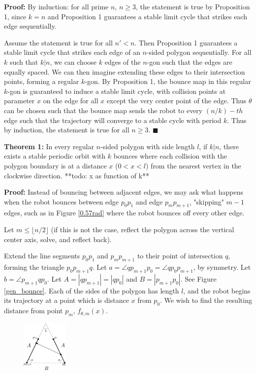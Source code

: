 \documentclass[letterpaper, 10 pt, conference]{ieeeconf}  %
\begin{document}
\textbf{Proof:} By induction: for all prime $n$, $n \geq 3$, the statement is true by
Proposition 1, since $k=n$ and Proposition 1 guarantees a stable limit cycle that strikes
each edge sequentially.

Assume the statement is true for all $n' < n$. Then Proposition 1 guarantees a stable
limit cycle that strikes each edge of an $n$-sided polygon sequentially. For all
$k$ such that $k|n$, we can choose $k$ edges of the $n$-gon such that the edges
are equally spaced. We can then imagine extending these edges to their
intersection points, forming a regular $k$-gon. By Proposition 1, the bounce map in this
regular $k$-gon is guaranteed to induce a stable limit cycle, with collision
points at parameter $x$ on the edge for all $x$ except the very center point
of the edge. Thus $\theta$ can be chosen such that the bounce map sends the
robot to every $(n/k)-th$ edge such that the trajectory will converge to a
stable cycle with period $k$. Thus by induction, the statement is true for all
$n \geq 3$. \hfill $\blacksquare$

\textbf{Theorem 1:} In every regular $n$-sided polygon with side length $l$, if $k|n$,
there exists a stable periodic orbit with $k$ bounces where each collision with
the polygon boundary is at a distance $x$ ($0 < x < l$) from the nearest vertex in
the clockwise direction. **todo: x as function of k** 

\textbf{Proof:} Instead of bouncing between adjacent edges, we may ask what happens when the
robot bounces between edge $p_0 p_1$ and edge $p_m p_{m+1}$, "skipping" $m-1$
edges, such as in Figure \ref{0.57rad} where the robot bounces off every other
edge.

Let $m \leq \lfloor n/2 \rfloor$ (if this is not the case, reflect the polygon
across the vertical center axis, solve, and reflect back).

Extend the line segments $p_0 p_1$ and $p_m p_{m+1}$ to their point of
intersection $q$, forming the triangle $p_0 p_{m+1} q$. Let $a = \angle q
p_{m+1} p_0 = \angle q p_0 p_{m+1}$, by symmetry. Let $b = \angle p_{m+1} q
p_0$. Let $A = |q p_{m+1}| = |q p_0|$ and $B = |p_{m+1} p_0|$. See Figure
\ref{gen_bounce}. Each of the sides of the polygon has length $l$, and the robot
begins its trajectory at a point which is distance $x$ from $p_0$. We wish to
find the resulting distance from point $p_m$, $f_{\theta, m}(x)$.

\begin{figure}
\centering

\includegraphics[width=0.2\textwidth]{figs/gen_bounce.pdf}


\end{figure}
\end{document}
